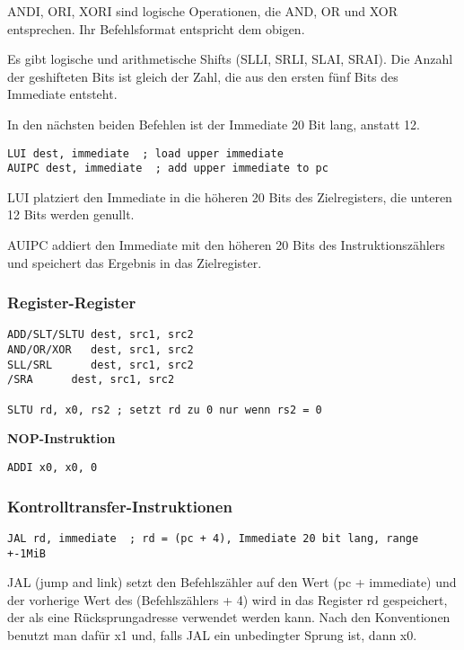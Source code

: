 ANDI, ORI, XORI sind logische Operationen, die AND, OR und XOR entsprechen. Ihr
Befehlsformat entspricht dem obigen.

Es gibt logische und arithmetische Shifts (SLLI, SRLI, SLAI, SRAI). Die Anzahl
der geshifteten Bits ist gleich der Zahl, die aus den ersten fünf Bits des
Immediate entsteht.

In den nächsten beiden Befehlen ist der Immediate 20 Bit lang, anstatt 12.

\begin{lstlisting}[style=risc-v_Assembler]
LUI dest, immediate  ; load upper immediate
AUIPC dest, immediate  ; add upper immediate to pc
\end{lstlisting}

LUI platziert den Immediate in die höheren 20 Bits des Zielregisters, die unteren 12 Bits werden genullt.

AUIPC addiert den Immediate mit den höheren 20 Bits des Instruktionszählers und speichert das Ergebnis in das Zielregister.

\subsubsection{Register-Register}

\begin{lstlisting}[style=risc-v_Assembler]
ADD/SLT/SLTU dest, src1, src2
AND/OR/XOR   dest, src1, src2
SLL/SRL      dest, src1, src2
/SRA      dest, src1, src2

SLTU rd, x0, rs2 ; setzt rd zu 0 nur wenn rs2 = 0
\end{lstlisting}

\textbf{NOP-Instruktion}

\begin{lstlisting}[style=risc-v_Assembler]
ADDI x0, x0, 0
\end{lstlisting}

\subsubsection{Kontrolltransfer-Instruktionen}

\begin{lstlisting}[style=risc-v_Assembler]
JAL rd, immediate  ; rd = (pc + 4), Immediate 20 bit lang, range +-1MiB
\end{lstlisting}

JAL (jump and link) setzt den Befehlszähler auf den Wert (pc + immediate) und
der vorherige Wert des (Befehlszählers + 4) wird in das Register rd gespeichert,
der als eine Rücksprungadresse verwendet werden kann. Nach den Konventionen
benutzt man dafür x1 und, falls JAL ein unbedingter Sprung ist, dann x0.

